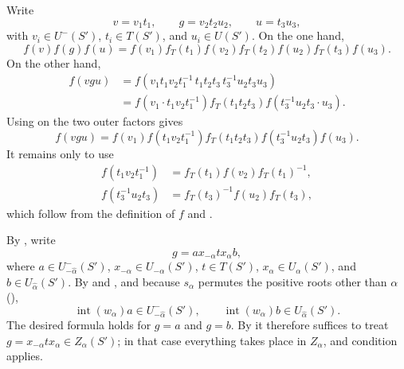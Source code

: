 Write
\[
  v=v_1t_1,\qquad g=v_2t_2u_2,\qquad u=t_3u_3,
\]
with \(v_i\in U^-(S')\), \(t_i\in T(S')\), and \(u_i\in U(S')\).
On the one hand,
\[
  f(v)f(g)f(u)
  =f(v_1)f_T(t_1)f(v_2)f_T(t_2)f(u_2)f_T(t_3)f(u_3).
\]
On the other hand,
\[
\begin{aligned}
 f(vgu)
 &=f(v_1t_1v_2t_1^{-1}\,t_1t_2t_3\,
       t_3^{-1}u_2t_3u_3)\\
 &=f(v_1\cdot t_1v_2t_1^{-1})f_T(t_1t_2t_3)
       f(t_3^{-1}u_2t_3\cdot u_3).
\end{aligned}
\]
Using  on the two outer factors gives
\[
 f(vgu)=f(v_1)f(t_1v_2t_1^{-1})f_T(t_1t_2t_3)
   f(t_3^{-1}u_2t_3)f(u_3).
\]
It remains only to use
\[
\begin{aligned}
 f(t_1v_2t_1^{-1})&=f_T(t_1)f(v_2)f_T(t_1)^{-1},\\
 f(t_3^{-1}u_2t_3)&=f_T(t_3)^{-1}f(u_2)f_T(t_3),
\end{aligned}
\]
which follow from the definition of \(f\) and .


By , write
\[
  g=ax_{-\alpha}tx_\alpha b,
\]
where \(a\in U^-_{-\widehat\alpha}(S')\),
\(x_{-\alpha}\in U_{-\alpha}(S')\), \(t\in T(S')\),
\(x_\alpha\in U_\alpha(S')\), and
\(b\in U_{\widehat\alpha}(S')\). By  and , and because
\(s_\alpha\) permutes the positive roots other than \(\alpha\)
(),
\[
  \operatorname{int}(w_\alpha)a\in U^-_{-\widehat\alpha}(S'),
  \qquad
  \operatorname{int}(w_\alpha)b\in U_{\widehat\alpha}(S').
\]
The desired formula holds for \(g=a\) and \(g=b\). By  it
therefore suffices to treat
\(g=x_{-\alpha}tx_\alpha\in Z_\alpha(S')\); in that case everything
takes place in \(Z_\alpha\), and condition  applies.


